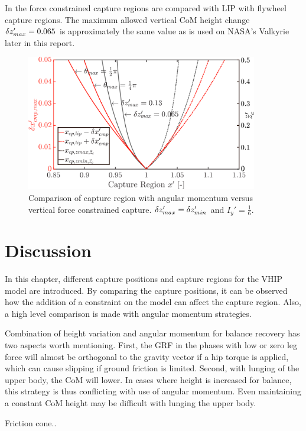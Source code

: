 In  the force constrained capture regions are compared with \ac{LIP} with flywheel capture regions. The maximum allowed vertical \ac{CoM} height change $\delta z_{max}' =0.065$ is approximately the same value as is used on NASA's Valkyrie later in this report.
\begin{figure}
\centering
\includegraphics[width=0.9\textwidth]{STYLESTUFF/capcompare.png}
\caption{Comparison of capture region with angular momentum versus vertical force constrained capture. $\delta z_{max}' =\delta z_{min}'$ and $I_y' = \frac{1}{6}$.}
\label{fig:capcompare}
\end{figure}

\section{Discussion}
In this chapter, different capture positions and capture regions for the \ac{VHIP} model are introduced. By comparing the capture positions, it can be observed how the addition of a constraint on the model can affect the capture region. Also, a high level comparison is made with angular momentum strategies.

Combination of height variation and angular momentum for balance recovery has two aspects worth mentioning. First, the \ac{GRF} in the phases with low or zero leg force will almost be orthogonal to the gravity vector if a hip torque is applied, which can cause slipping if ground friction is limited. Second, with lunging of the upper body, the \ac{CoM} will lower. In cases where height is increased for balance, this strategy is thus conflicting with use of angular momentum. Even maintaining a constant \ac{CoM} height may be difficult with lunging the upper body.

Friction cone..